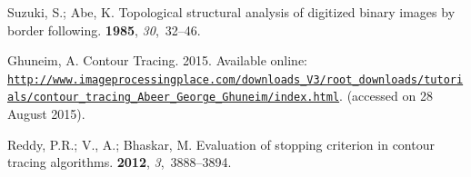 \documentclass[sensors,article,accept,moreauthors,pdftex,10pt,a4paper]{mdpi}
\begin{document}
\begin{thebibliography}{999}
Suzuki, S.; Abe, K.
\newblock Topological structural analysis of digitized binary images by border
 following.
 {\bf 1985},
 {\em 30},~32--46.

Ghuneim, A.
\newblock Contour Tracing. 2015.
\newblock
 Available online: \href{http://www.imageprocessingplace.com/downloads\_V3/root\_downloads/tutorials/contour\_tracing\_Abeer\_George\_Ghuneim/index.html}
 {\nolinkurl{http://www.imageprocessingplace.com/downloads\_V3/root\_downloads/tutorials/contour\_tracing\_Abeer\_George\_Ghuneim/index.html}}.
(accessed on 28 August 2015).

Reddy, P.R.; V., A.; Bhaskar, M.
\newblock Evaluation of stopping criterion in contour tracing algorithms.
 {\bf 2012}, {\em 3},~3888--3894.

\end{thebibliography}



%


%
\end{document}
